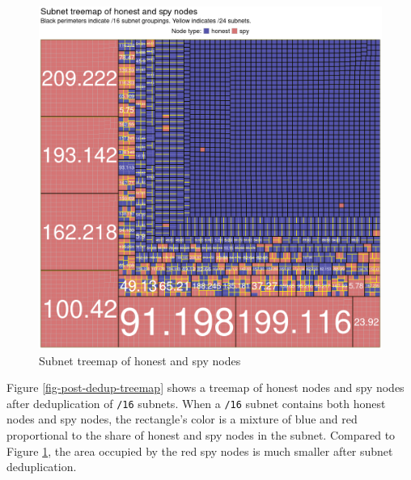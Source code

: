 \documentclass[usletter,11pt,english,openany]{article}
\begin{document}
\begin{figure}[H]
\caption{Subnet treemap of honest and spy nodes}

\label{fig-pre-dedup-treemap}

\includegraphics[scale=0.5]{images/treemap-status-quo}
\end{figure}

Figure \ref{fig-post-dedup-treemap} shows a treemap of honest nodes
and spy nodes after deduplication of \texttt{/16} subnets. When a
\texttt{/16} subnet contains both honest nodes and spy nodes, the
rectangle's color is a mixture of blue and red proportional to the
share of honest and spy nodes in the subnet. Compared to Figure \ref{fig-pre-dedup-treemap},
the area occupied by the red spy nodes is much smaller after subnet
deduplication.
\end{document}
